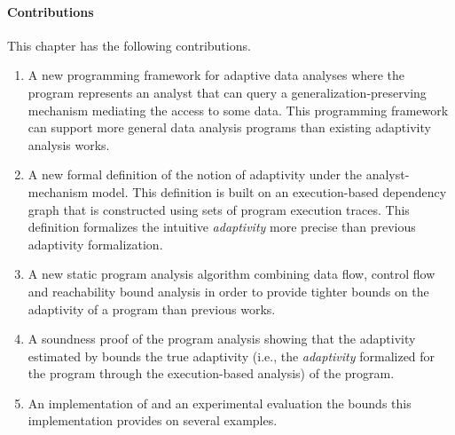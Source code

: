 \paragraph{Contributions}
This chapter has the following contributions.
\begin{enumerate}
   \item A new programming framework for adaptive data analyses
   where the program represents an analyst that can query a generalization-preserving mechanism mediating the access to some data. 
   This programming framework can support more general data analysis programs than existing adaptivity analysis works.
   \item 
   A new formal definition of the notion of adaptivity under the analyst-mechanism model. 
   This definition is built on an execution-based dependency graph that is constructed using sets of program execution traces.
   This definition formalizes the intuitive \emph{adaptivity} more precise than previous adaptivity formalization.
   \item 
   A new static program analysis algorithm {\THESYSTEM} combining data flow,
   control flow and reachability bound analysis in order to provide tighter bounds on the adaptivity of a program than previous works.
   \item A soundness proof of the program analysis showing that the adaptivity estimated by {\THESYSTEM} bounds the true adaptivity
   (i.e., the \emph{adaptivity} formalized for the program through the execution-based analysis) of the program. 
   \item An implementation of {\THESYSTEM} and an experimental evaluation the bounds this implementation provides on several examples.
\end{enumerate}
%

